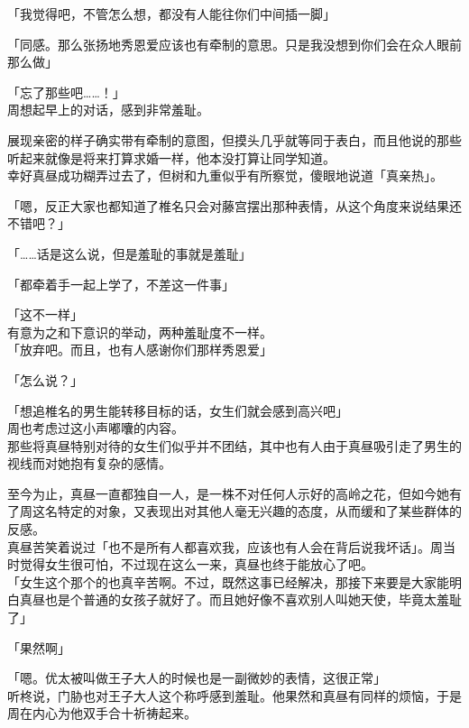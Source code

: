 「我觉得吧，不管怎么想，都没有人能往你们中间插一脚」

「同感。那么张扬地秀恩爱应该也有牵制的意思。只是我没想到你们会在众人眼前那么做」

「忘了那些吧……！」\\

周想起早上的对话，感到非常羞耻。

展现亲密的样子确实带有牵制的意图，但摸头几乎就等同于表白，而且他说的那些听起来就像是将来打算求婚一样，他本没打算让同学知道。\\

幸好真昼成功糊弄过去了，但树和九重似乎有所察觉，傻眼地说道「真亲热」。

「嗯，反正大家也都知道了椎名只会对藤宫摆出那种表情，从这个角度来说结果还不错吧？」

「……话是这么说，但是羞耻的事就是羞耻」

「都牵着手一起上学了，不差这一件事」

「这不一样」\\

有意为之和下意识的举动，两种羞耻度不一样。\\

「放弃吧。而且，也有人感谢你们那样秀恩爱」

「怎么说？」

「想追椎名的男生能转移目标的话，女生们就会感到高兴吧」\\

周也考虑过这小声嘟囔的内容。\\

那些将真昼特别对待的女生们似乎并不团结，其中也有人由于真昼吸引走了男生的视线而对她抱有复杂的感情。

至今为止，真昼一直都独自一人，是一株不对任何人示好的高岭之花，但如今她有了周这名特定的对象，又表现出对其他人毫无兴趣的态度，从而缓和了某些群体的反感。\\

真昼苦笑着说过「也不是所有人都喜欢我，应该也有人会在背后说我坏话」。周当时觉得女生很可怕，不过现在这么一来，真昼也终于能放心了吧。\\

「女生这个那个的也真辛苦啊。不过，既然这事已经解决，那接下来要是大家能明白真昼也是个普通的女孩子就好了。而且她好像不喜欢别人叫她天使，毕竟太羞耻了」

「果然啊」

「嗯。优太被叫做王子大人的时候也是一副微妙的表情，这很正常」\\

听柊说，门胁也对王子大人这个称呼感到羞耻。他果然和真昼有同样的烦恼，于是周在内心为他双手合十祈祷起来。\\

